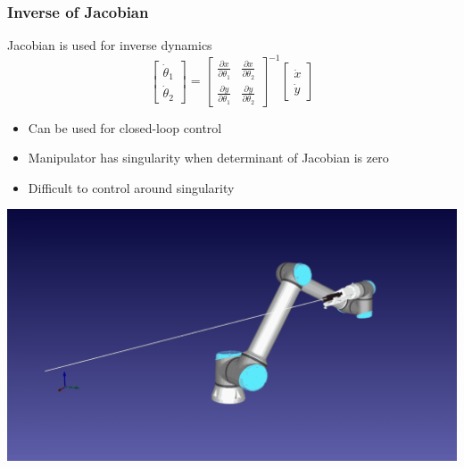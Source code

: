 \documentclass[10pt]{article}
\begin{document}
\subsubsection*{Inverse of Jacobian}
Jacobian is used for inverse dynamics
\[\begin{bmatrix} \dot{\theta}_1 \\ \dot{\theta}_2 \end{bmatrix} = \begin{bmatrix} \frac{\partial x}{\partial \theta_1} & \frac{\partial x}{\partial \theta_2} \\ \frac{\partial y}{\partial \theta_1} & \frac{\partial y}{\partial \theta_2} \end{bmatrix}^{-1} \begin{bmatrix} \dot{x} \\ \dot{y} \end{bmatrix}\]
\begin{itemize}
	\item Can be used for closed-loop control
	\item Manipulator has singularity when determinant of Jacobian is zero
	\item Difficult to control around singularity
\end{itemize}
\begin{center} 
	\includegraphics*[width=\textwidth]{L2_1.png} 
\end{center}
\end{document}
